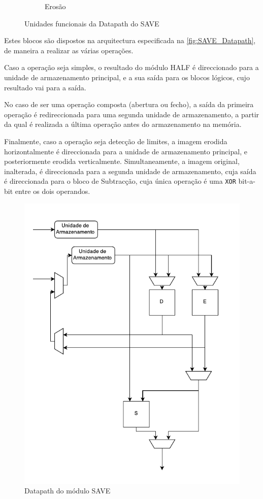 \documentclass[a4paper]{article}
\begin{document}
\begin{figure}[h]
\begin{subfigure}[b]{0.45\textwidth}
		\caption{Erosão}
		\label{fig:SAVE_datapath_E}
	\end{subfigure}
	\caption{Unidades funcionais da Datapath do SAVE}
	\label{fig:SAVE_datapath_E_D}
\end{figure}

Estes blocos são dispostos na arquitectura especificada na \autoref{fig:SAVE_Datapath}, de maneira a realizar as várias operações.

Caso a operação seja simples, o resultado do módulo HALF é direccionado para a unidade de armazenamento principal, e a sua saída para os blocos lógicos, cujo resultado vai para a saída.

No caso de ser uma operação composta (abertura ou fecho), a saída da primeira operação é redireccionada para uma segunda unidade de armazenamento, a partir da qual é realizada a última operação antes do armazenamento na memória.

Finalmente, caso a operação seja detecção de limites, a imagem erodida horizontalmente é direccionada para a unidade de armazenamento principal, e posteriormente erodida verticalmente. Simultaneamente, a imagem original, inalterada, é direccionada para a segunda unidade de armazenamento, cuja saída é direccionada para o bloco de Subtracção, cuja única operação é uma \texttt{XOR} bit-a-bit entre os dois operandos.

\begin{figure}[h]
	\centering
	\includegraphics[width=0.6\linewidth]{SAVE_Datapath}
	\caption{Datapath do módulo SAVE}
	\label{fig:SAVE_Datapath}
\end{figure}
\end{document}
